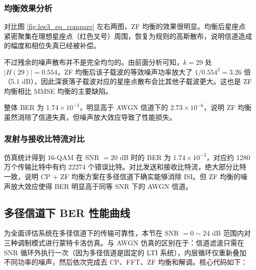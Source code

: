 \documentclass[a4paper, 11pt]{ctexart}
\begin{document}
\subsubsection{均衡效果分析}

对比图 \ref{fig:hw3_eq_compare} 左右两图，ZF 均衡的效果很明显。均衡后星座点紧密聚集在理想星座点（红色叉号）周围，恢复为规则的高斯散布，说明信道造成的幅度和相位失真已经被补偿。

不过残余的噪声散布并不是完全均匀的。由前面分析可知，$k=29$ 处 $|H(29)| = 0.554$，ZF 均衡后该子载波的等效噪声功率放大了 $1/0.554^2 = 3.26$ 倍（5.1 dB），因此深衰落子载波对应的星座点散布会比其他子载波更大。这也是 ZF 均衡相比 MMSE 均衡的主要缺陷。

整体 BER 为 $1.74 \times 10^{-3}$，明显高于 AWGN 信道下的 $2.73 \times 10^{-6}$，说明 ZF 均衡虽然消除了信道失真，但噪声放大效应导致了性能损失。

\subsubsection{发射与接收比特流对比}

仿真统计得到 16-QAM 在 SNR $= 20$ dB 时的 BER 为 $1.74 \times 10^{-3}$，对应约 1280 万个传输比特中有约 22274 个错误比特。对比发送和接收比特流，绝大部分比特一致，说明 CP + ZF 均衡方案在多径信道下确实能够消除 ISI。但 ZF 均衡的噪声放大效应使得 BER 明显高于同等 SNR 下的 AWGN 信道。

\subsection{多径信道下 BER 性能曲线}

为全面评估系统在多径信道下的传输可靠性，本节在 SNR $= 0 \sim 24$ dB 范围内对三种调制模式进行蒙特卡洛仿真。与 AWGN 仿真的区别在于：信道滤波只需在 SNR 循环外执行一次（因为多径信道是固定的 LTI 系统），内层循环仅重新叠加不同功率的噪声，然后依次完成去 CP、FFT、ZF 均衡和解调。核心代码如下：
\end{document}
